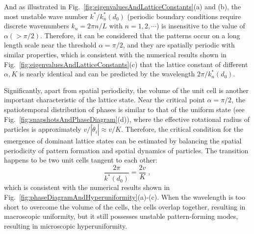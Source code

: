 \documentclass{article}
\begin{document}
And as illustrated in Fig.~\ref{fig:eigenvaluesAndLatticeConstants}(a) and (b), the most unstable wave number $k^{*}/k^{*}_n(d_0)$ (periodic boundary conditions require discrete wavenumbers $k_n=2\pi n/L$ with $n=1,2,\cdots$) is insensitive to the value of $\alpha (>\pi/2)$. 
Therefore, it can be considered that the patterns occur on a long length scale near the threshold $\alpha = \pi/2$, and they are spatially periodic with similar properties, which is consistent with the numerical results shown in Fig.~\ref{fig:eigenvaluesAndLatticeConstants}(c) that the lattice constant of different $\alpha, K$ is nearly identical and can be predicted by the wavelength $2\pi/k^{*}_n(d_0)$.

Significantly, apart from spatial periodicity, the volume of the unit cell is another important characteristic of the lattice state. 
Near the critical point $\alpha = \pi/2$, the spatiotemporal distribution of phases is similar to that of the uniform state (see Fig.~\ref{fig:snapshotsAndPhaseDiagram}(d)), where the effective rotational radius of particles is approximately $v/|\dot{\theta}_i| \approx v/K$.
Therefore, the critical condition for the emergence of dominant lattice states can be estimated by balancing the spatial periodicity of pattern formation and spatial dynamics of particles. The transition happens to be two unit cells tangent to each other:
\begin{equation}
    \frac{2\pi}{k^*\left( d_0 \right)}=\frac{2v}{K}\;,
    \label{eq:criticalLineOfKD0}
\end{equation}
which is consistent with the numerical results shown in Fig.~\ref{fig:phaseDiagramAndHyperuniformity}(a)-(c). When the wavelength is too short to overcome the volume of the cells, the cells overlap together, resulting in macroscopic uniformity, but it still possesses unstable pattern-forming modes, resulting in microscopic hyperuniformity.


\end{document}
